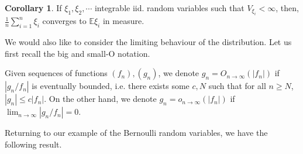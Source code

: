 \documentclass[]{article}
\theoremstyle{definition}
\newtheorem{corollary}{Corollary}[theorem]
\theoremstyle{definition}
\begin{document}
\begin{corollary}
  If \(\xi_1, \xi_2, \cdots\) integrable iid. random variables such that \(V_{\xi_i} < \infty\), 
  then, \(\frac{1}{n}\sum_{i = 1}^n \xi_i\) converges to \(\mathbb{E}\xi_i\) in measure.
\end{corollary}

We would also like to consider the limiting behaviour of the distribution. 
Let us first recall the big and small-O notation. 

Given sequences of functions \((f_n), (g_n)\), we denote \(g_n = O_{n \to \infty}(|f_n|)\) 
if \(|g_n / f_n|\) is eventually bounded, i.e. there exists some \(c, N\) such that 
for all \(n \ge N\), \(|g_n| \le c|f_n|\). On the other hand, we denote 
\(g_n = o_{n \to \infty}(|f_n|)\) if \(\lim_{n \to \infty} |g_n / f_n| = 0\). 

Returning to our example of the Bernoulli random variables, we have the following 
result.
\end{document}
